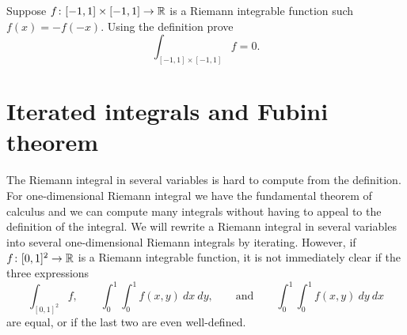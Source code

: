 \begin{exercise}
Suppose $f\colon [-1,1] \times [-1,1] \to {\mathbb{R}}$ is a Riemann
integrable function such $f(x) = -f(-x)$.  Using the definition prove
\begin{equation*}
\int_{[-1,1] \times [-1,1]} f = 0 .
\end{equation*}
\end{exercise}


\sectionnewpage
\section{Iterated integrals and Fubini theorem}
\label{sec:iteratedints}


The Riemann integral in several variables
is hard to compute from the definition.
For one-dimensional Riemann integral we have the fundamental
theorem of calculus
and we can compute many integrals without
having to appeal to the definition of the integral.
We will rewrite 
a Riemann integral in several variables into
several one-dimensional Riemann integrals
by iterating.  However, if $f \colon [0,1]^2 \to {\mathbb{R}}$ is a Riemann integrable
function, it is not immediately clear if the three expressions
\begin{equation*}
\int_{[0,1]^2} f ,
\qquad
\int_0^1 \int_0^1 f(x,y) ~ dx ~ dy ,
\qquad \text{and}
\qquad
\int_0^1 \int_0^1 f(x,y) ~ dy ~ dx
\end{equation*}
are equal, or if the last two are even well-defined.

